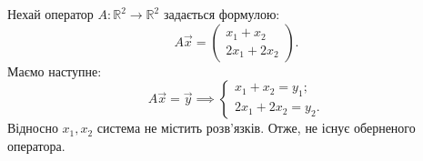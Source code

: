 \documentclass{math_library}
\begin{document}

	
	\begin{example}
	Нехай оператор $A \colon \mathbb{R}^2 \to \mathbb{R}^2$ задається формулою:
	\[
	A\vec{x} = \begin{pmatrix}
	x_1 + x_2 \\ 2x_1 + 2x_2
	\end{pmatrix}.
	\]
	Маємо наступне:
	\[
	A\vec{x} = \vec{y} \implies \begin{cases} x_1 + x_2 = y_1; \\ 2x_1 + 2x_2 = y_2. \end{cases}
	\]
	Відносно $x_1,x_2$ система не містить розв'язків. Отже, не існує оберненого оператора.
	\end{example}
	
\end{document}
